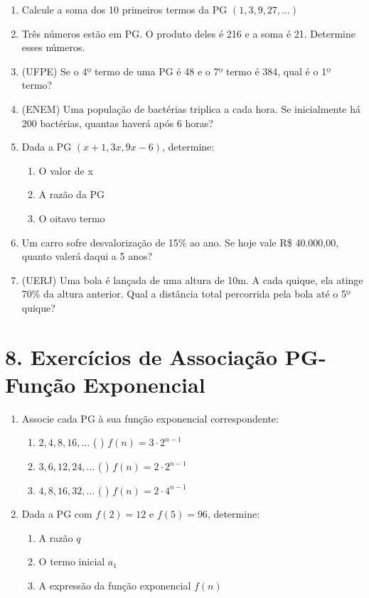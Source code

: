 \documentclass[11pt]{article}
\begin{document}
\begin{multicols}{2}
\begin{enumerate}[leftmargin=*]
\item Calcule a soma dos 10 primeiros termos da PG $(1, 3, 9, 27, \ldots)$

\item Três números estão em PG. O produto deles é 216 e a soma é 21. Determine esses números.

\item (UFPE) Se o 4º termo de uma PG é 48 e o 7º termo é 384, qual é o 1º termo?

\item (ENEM) Uma população de bactérias triplica a cada hora. Se inicialmente há 200 bactérias, quantas haverá após 6 horas?

\item Dada a PG $(x+1, 3x, 9x-6)$, determine:
\begin{enumerate}[label=\alph*)]
\item O valor de x
\item A razão da PG
\item O oitavo termo
\end{enumerate}

\item Um carro sofre desvalorização de 15\% ao ano. Se hoje vale R\$ 40.000,00, quanto valerá daqui a 5 anos?

\item (UERJ) Uma bola é lançada de uma altura de 10m. A cada quique, ela atinge 70\% da altura anterior. Qual a distância total percorrida pela bola até o 5º quique?

\end{enumerate}

\section*{8. Exercícios de Associação PG-Função Exponencial}
\begin{enumerate}
\item Associe cada PG à sua função exponencial correspondente:
\begin{enumerate}[label=\alph*)]
\item $2, 4, 8, 16, \ldots$ \quad ( ) $f(n) = 3 \cdot 2^{n-1}$
\item $3, 6, 12, 24, \ldots$ \quad ( ) $f(n) = 2 \cdot 2^{n-1}$
\item $4, 8, 16, 32, \ldots$ \quad ( ) $f(n) = 2 \cdot 4^{n-1}$
\end{enumerate}

\item Dada a PG com $f(2) = 12$ e $f(5) = 96$, determine:
\begin{enumerate}[label=\alph*)]
\item A razão $q$
\item O termo inicial $a_1$
\item A expressão da função exponencial $f(n)$
\end{enumerate}


\end{enumerate}
\end{multicols}
\end{document}
